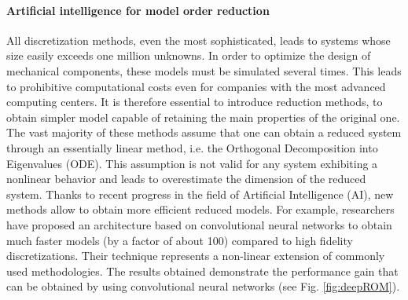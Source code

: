 \documentclass[12pt]{article}
\begin{document}
	\paragraph{Artificial intelligence for model order reduction\\}
	All discretization methods, even the most sophisticated, leads to systems whose size easily exceeds one million unknowns. In order to optimize the design of mechanical components, these models must be simulated several times. This leads to prohibitive computational costs even for companies with the most advanced computing centers. It is therefore essential to introduce reduction methods, to obtain simpler model capable of retaining the main properties of the original one. The vast majority of these methods assume that one can obtain a reduced system through an essentially linear method, i.e. the Orthogonal Decomposition into Eigenvalues (ODE). This assumption is not valid for any system exhibiting a nonlinear behavior and leads to overestimate the dimension of the reduced system. Thanks to recent progress in the field of Artificial Intelligence (AI), new methods allow to obtain more efficient reduced models. For example, researchers have proposed an architecture based on convolutional neural networks to obtain much faster models (by a factor of about 100) compared to high fidelity discretizations. Their technique represents a non-linear extension of commonly used methodologies. The results obtained demonstrate the performance gain that can be obtained by using convolutional neural networks (see Fig. \ref{fig:deepROM}).
	
\end{document}
